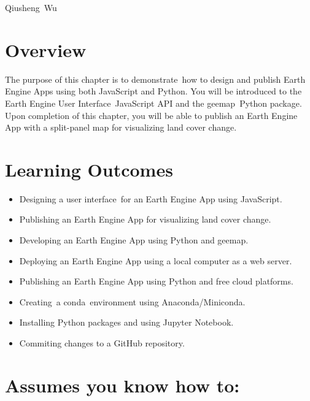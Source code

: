 \documentclass[
  letterpaper,
  DIV=11,
  numbers=noendperiod]{scrreprt}
\providecommand{\tightlist}{%
  \setlength{\itemsep}{0pt}\setlength{\parskip}{0pt}}\usepackage{longtable,booktabs,array}
\begin{document}

Qiusheng~Wu

\hypertarget{overview-23}{%
\section*{Overview}\label{overview-23}}


The purpose of this chapter is to demonstrate~how to design and publish
Earth Engine Apps using both JavaScript and Python. You will be
introduced to the Earth Engine User Interface~JavaScript API and the
geemap~Python package. Upon completion of this chapter, you will be able
to publish an Earth Engine App with a split-panel map for visualizing
land cover change.

\hypertarget{learning-outcomes-23}{%
\section*{Learning Outcomes}\label{learning-outcomes-23}}


\begin{itemize}
\tightlist
\item
  Designing a user interface~for an Earth Engine App using JavaScript.
\item
  Publishing an Earth Engine App for visualizing land cover change.
\item
  Developing an Earth Engine App using Python and geemap.
\item
  Deploying an Earth Engine App using a local computer as a web server.
\item
  Publishing an Earth Engine App using Python and free cloud platforms.
\item
  Creating~a conda~environment using Anaconda/Miniconda.
\item
  Installing Python packages and using Jupyter Notebook.
\item
  Commiting changes to a GitHub repository.
\end{itemize}

\hypertarget{assumes-you-know-how-to-23}{%
\section*{Assumes you know how to:}\label{assumes-you-know-how-to-23}}

\end{document}

